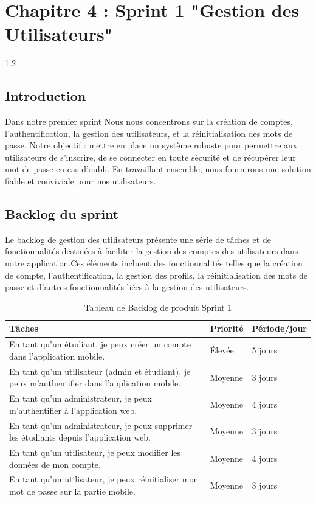 \chapter{ Chapitre 4 : Sprint 1 \centering
    "Gestion des Utilisateurs"  }
\begin{spacing}{1.2}
\minitoc
\thispagestyle{MyStyle}
\end{spacing}
\newpage
\begin{sloppypar} 
\section{Introduction}
\vspace{-4mm}
Dans notre premier sprint Nous nous concentrons sur la création de comptes, l'authentification, la gestion des utilisateurs, et la réinitialisation des mots de passe. Notre objectif : mettre en place un système robuste pour permettre aux utilisateurs de s'inscrire, de se connecter en toute sécurité et de récupérer leur mot de passe en cas d'oubli. En travaillant ensemble, nous fournirons une solution fiable et conviviale pour nos utilisateurs.
\vspace{-7mm}
\section{Backlog du sprint}
\vspace{-7mm}
Le backlog de gestion des utilisateurs présente une série de tâches et de fonctionnalités destinées à faciliter la gestion des comptes des utilisateurs dans notre application.Ces éléments incluent des fonctionnalités telles que la création de compte, l'authentification, la gestion des profils, la réinitialisation des mots de passe et d'autres fonctionnalités liées à la gestion des utilisateurs. 

\begin{table}[h]
\centering
\begin{tabular}{|p{10cm}|p{2cm}|p{2.5cm}|}
\hline
\textbf{Tâches} & \textbf{Priorité} & \textbf{Période/jour} \\
\hline
En tant qu’un étudiant, je peux créer un compte dans l’application mobile. & Élevée & 5 jours \\
\hline
En tant qu’un utilisateur (admin et étudiant), je peux m’authentifier dans l’application mobile. & Moyenne & 3 jours \\
\hline
En tant qu’un administrateur, je peux m’authentifier à l’application web. & Moyenne & 4 jours \\
\hline
En tant qu’un administrateur, je peux supprimer les étudiants depuis l’application web. & Moyenne & 3 jours \\
\hline
En tant qu'un utilisateur, je peux modifier les données de mon compte. & Moyenne & 4 jours \\
\hline
En tant qu'un utilisateur, je peux réinitialiser mon mot de passe sur la partie mobile. & Moyenne & 3 jours \\
\hline
\end{tabular}
\caption{Tableau de Backlog de produit Sprint 1}
\end{table}


\end{sloppypar}
